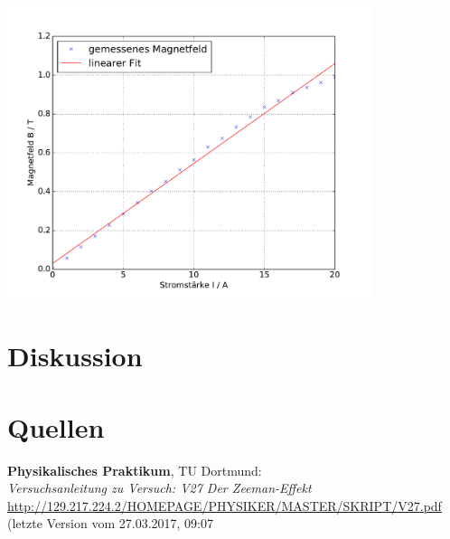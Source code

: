 \documentclass[captions=tableheading]{scrartcl}
\begin{document}
\begin{center}
	\includegraphics[width=0.8\textwidth]{images/magnetfeld.pdf}
	\label{fig:magnetfeld}
\end{center}
\section{Diskussion}

\section{Quellen}
\begin{enumerate}[label={[\arabic*]}]
\item \label{q:anleitung} \textbf{Physikalisches Praktikum}, TU Dortmund: \\
\textit{Versuchsanleitung zu Versuch: V27 Der Zeeman-Effekt} \\
\url{http://129.217.224.2/HOMEPAGE/PHYSIKER/MASTER/SKRIPT/V27.pdf} (letzte Version vom 27.03.2017, 09:07
\end{enumerate}
\end{document}
